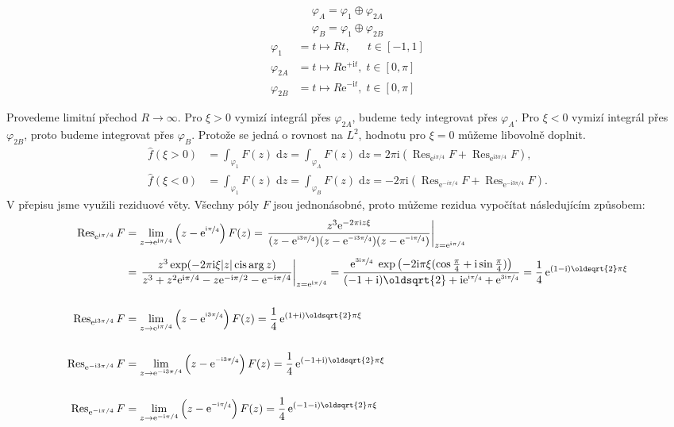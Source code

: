 \documentclass[10pt,a4paper]{article}
\def\ph{\phantom}
\newcommand{\const}[1]{\text{#1}}
\newcommand{\cis}{\operatorname{cis}}
\newcommand{\Res}{\operatorname{Res}}
\renewcommand{\d}[1]{\;\const{d}#1}
\newcommand{\e}[1]{\const{e}^{#1}}
\renewcommand{\i}{\const{i}}
\begin{document}
\begin{gather*}
    \varphi_A = \varphi_1 \oplus \varphi_{2A} \\
    \varphi_B = \varphi_1 \oplus \varphi_{2B}
\end{gather*}
\begin{align*}
    \varphi_{1\ph{A}} &= t \mapsto Rt, \; \ph{^+\i t} t \in [-1, 1] \\
    \varphi_{2A} &= t \mapsto R \e{+\i t}, \; t \in [0, \pi] \\
    \varphi_{2B} &= t \mapsto R \e{-\i t}, \; t \in [0, \pi]
\end{align*}

Provedeme limitní přechod $R\to\infty$. Pro $\xi > 0$ vymizí integrál přes $\varphi_{2A}$, budeme tedy integrovat přes $\varphi_A$. Pro $\xi < 0$ vymizí integrál přes $\varphi_{2B}$, proto budeme integrovat přes $\varphi_B$. Protože se jedná o rovnost na $L^2$, hodnotu pro $\xi=0$ můžeme libovolně doplnit.
\begin{align*}
    \hat{f}(\xi > 0)
    &= \int_{\varphi_1} F(z) \d{z}
    = \int_{\varphi_A} F(z) \d{z}
    = 2\pi\i \left( \Res_{\e{i\pi/4}} F + \Res_{\e{\i 3\pi/4}} F \right),
    \\[10pt]
    \hat{f}(\xi < 0)
    &= \int_{\varphi_1} F(z) \d{z}
    = \int_{\varphi_B} F(z) \d{z}
    = -2\pi\i \left( \Res_{\e{-i\pi/4}} F + \Res_{\e{-\i 3\pi/4}} F \right).
\end{align*}
V přepisu jsme využili reziduové věty. Všechny póly $F$ jsou jednonásobné, proto můžeme rezidua vypočítat následujícím způsobem:
\begin{align*}
    \Res_{\e{\i\pi/4}} F
    &= \lim_{z\to\e{\i\pi/4}} \left( z - \e{\nicefrac{\i\pi}{4}} \right) F(z)
    = \left. \frac{z^3 \e{-2\pi\i z\xi}}{(z-\e{\nicefrac{\i3\pi}{4}})(z-\e{\nicefrac{-\i3\pi}{4}})(z-\e{\nicefrac{-\i\pi}{4}})} \right|_{z=\e{\i\pi/4}}
    \\[5pt]
    &= \left. \frac{z^3 \exp(-2\pi\i\xi|z| \cis \arg z)}{z^3 + z^2 \e{\i\pi/4} - z\e{-\i\pi/2} - \e{-\i\pi/4}} \right|_{z=\e{\i\pi/4}}
    = \frac{
        \e{\nicefrac{3\i\pi}{4}} \; \exp \left(-2\i\pi\xi  (\cos \frac{\pi}{4} + \i \sin \frac{\pi}{4}) \right)
    }{
        (-1+\i)\oldsqrt{2} + \i\e{\nicefrac{\i\pi}{4}} + \e{\nicefrac{3\i\pi}{4}}
    }
    = \frac{1}{4} \, \e{(1-\i)\oldsqrt{2}\pi\xi}
    \\[15pt]
    \Res_{\e{\i3\pi/4}} F
    &= \lim_{z\to\e{\i\pi/4}} \left( z - \e{\nicefrac{\i3\pi}{4}} \right) F(z)
    = \frac{1}{4} \, \e{(1+\i)\oldsqrt{2}\pi\xi}
    \\[15pt]
    \Res_{\e{-\i3\pi/4}} F
    &= \lim_{z\to\e{-\i3\pi/4}} \left( z - \e{\nicefrac{-\i3\pi}{4}} \right) F(z)
    = \frac{1}{4} \, \e{(-1+\i)\oldsqrt{2}\pi\xi}
    \\[15pt]
    \Res_{\e{-\i\pi/4}} F
    &= \lim_{z\to\e{-\i\pi/4}} \left( z - \e{\nicefrac{-\i\pi}{4}} \right) F(z)
    = \frac{1}{4} \, \e{(-1-\i)\oldsqrt{2}\pi\xi}
\end{align*}
\end{document}
